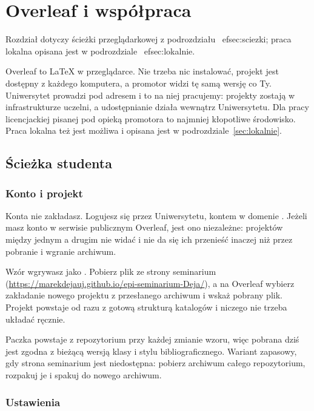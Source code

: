 \chapter{Overleaf i współpraca}\label{ch:overleaf}

Rozdział dotyczy ścieżki przeglądarkowej z podrozdziału~
ef{sec:sciezki}; praca lokalna opisana jest w podrozdziale~
ef{sec:lokalnie}.

Overleaf to LaTeX w przeglądarce. Nie trzeba nic instalować, projekt jest dostępny z każdego komputera, a promotor widzi tę samą wersję co Ty. Uniwersytet prowadzi  pod adresem  i to na niej pracujemy: projekty zostają w infrastrukturze uczelni, a udostępnianie działa wewnątrz Uniwersytetu. Dla pracy licencjackiej pisanej pod opieką promotora to najmniej kłopotliwe środowisko. Praca lokalna też jest możliwa i opisana jest w podrozdziale~\ref{sec:lokalnie}.

\section{Ścieżka studenta}\label{sec:overleafstudent}

\subsection{Konto i projekt}

Konta nie zakładasz. Logujesz się przez  Uniwersytetu, kontem w domenie . Jeżeli masz konto w serwisie publicznym Overleaf, jest ono niezależne: projektów między jednym a drugim nie widać i nie da się ich przenieść inaczej niż przez pobranie i wgranie archiwum.

Wzór wgrywasz jako . Pobierz plik  ze strony seminarium (\url{https://marekdejauj.github.io/epi-seminarium-Deja/}), a na Overleaf wybierz zakładanie nowego projektu z przesłanego archiwum i wskaż pobrany plik. Projekt powstaje od razu z gotową strukturą katalogów i niczego nie trzeba układać ręcznie.

Paczka powstaje z repozytorium przy każdej zmianie wzoru, więc pobrana dziś jest zgodna z bieżącą wersją klasy i stylu bibliograficznego. Wariant zapasowy, gdy strona seminarium jest niedostępna: pobierz archiwum całego repozytorium, rozpakuj je i spakuj  do nowego archiwum.

\subsection{Ustawienia}

